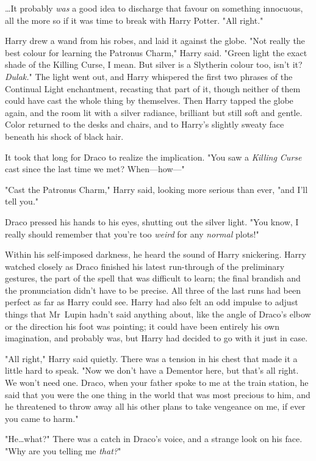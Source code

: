 …It probably \emph{was} a good idea to discharge that favour on something
innocuous, all the more so if it was time to break with Harry Potter. "All
right."

Harry drew a wand from his robes, and laid it against the globe. "Not really
the best colour for learning the Patronus Charm," Harry said. "Green light the
exact shade of the Killing Curse, I mean. But silver is a Slytherin colour too,
isn’t it? \emph{Dulak.}" The light went out, and Harry whispered the first two
phrases of the Continual Light enchantment, recasting that part of it, though
neither of them could have cast the whole thing by themselves. Then Harry
tapped the globe again, and the room lit with a silver radiance, brilliant but
still soft and gentle. Color returned to the desks and chairs, and to Harry’s
slightly sweaty face beneath his shock of black hair.

It took that long for Draco to realize the implication. "You saw a
\emph{Killing Curse} cast since the last time we met? When—how—"

"Cast the Patronus Charm," Harry said, looking more serious than ever, "and
I’ll tell you."

Draco pressed his hands to his eyes, shutting out the silver light. "You know,
I really should remember that you’re too \emph{weird} for any \emph{normal}
plots!"

Within his self-imposed darkness, he heard the sound of Harry snickering.
\later
Harry watched closely as Draco finished his latest run-through of the
preliminary gestures, the part of the spell that was difficult to learn; the
final brandish and the pronunciation didn’t have to be precise. All three of
the last runs had been perfect as far as Harry could see. Harry had also felt
an odd impulse to adjust things that Mr~Lupin hadn’t said anything about, like
the angle of Draco’s elbow or the direction his foot was pointing; it could
have been entirely his own imagination, and probably was, but Harry had decided
to go with it just in case.

"All right," Harry said quietly. There was a tension in his chest that made it
a little hard to speak. "Now we don’t have a Dementor here, but that’s all
right. We won’t need one. Draco, when your father spoke to me at the train
station, he said that you were the one thing in the world that was most
precious to him, and he threatened to throw away all his other plans to take
vengeance on me, if ever you came to harm."

"He…what?" There was a catch in Draco’s voice, and a strange look on
his face. "Why are you telling me \emph{that?}"

